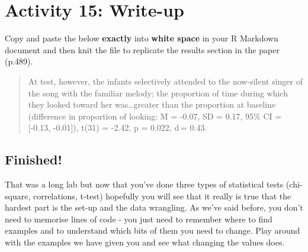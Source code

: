 \documentclass[]{book}
\newenvironment{Shaded}{\begin{snugshade}}{\end{snugshade}}
\newcommand{\ControlFlowTok}[1]{\textcolor[rgb]{0.13,0.29,0.53}{\textbf{#1}}}
\newcommand{\DataTypeTok}[1]{\textcolor[rgb]{0.13,0.29,0.53}{#1}}
\newcommand{\DecValTok}[1]{\textcolor[rgb]{0.00,0.00,0.81}{#1}}
\newcommand{\ErrorTok}[1]{\textcolor[rgb]{0.64,0.00,0.00}{\textbf{#1}}}
\newcommand{\KeywordTok}[1]{\textcolor[rgb]{0.13,0.29,0.53}{\textbf{#1}}}
\newcommand{\NormalTok}[1]{#1}
\newcommand{\OperatorTok}[1]{\textcolor[rgb]{0.81,0.36,0.00}{\textbf{#1}}}
\newcommand{\StringTok}[1]{\textcolor[rgb]{0.31,0.60,0.02}{#1}}
\begin{document}
\hypertarget{activity-15-write-up}{%
\section{Activity 15: Write-up}\label{activity-15-write-up}}

Copy and paste the below \textbf{exactly} into \textbf{white space} in your R Markdown document and then knit the file to replicate the results section in the paper (p.489).

\begin{Shaded}
\end{Shaded}

\begin{quote}
At test, however, the infants selectively attended to the now-silent singer of the song with the familiar melody; the proportion of time during which they looked toward her was\ldots{}greater than the proportion at baseline (difference in proportion of looking: M = -0.07, SD = 0.17, 95\% CI = {[}-0.13, -0.01{]}), t(31) = -2.42, p = 0.022, d = 0.43.
\end{quote}

\hypertarget{finished-6}{%
\subsection{Finished!}\label{finished-6}}

That was a long lab but now that you've done three types of statistical tests (chi-square, correlations, t-test) hopefully you will see that it really is true that the hardest part is the set-up and the data wrangling. As we've said before, you don't need to memorise lines of code - you just need to remember where to find examples and to understand which bits of them you need to change. Play around with the examples we have given you and see what changing the values does.
\end{document}
